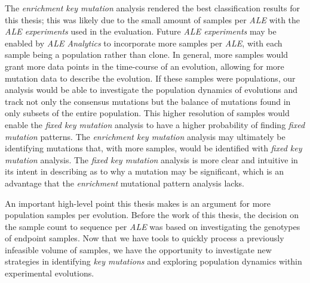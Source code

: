\documentclass[12pt,final,masters,chapterheads]{ucsd}  %
\begin{document}
The \textit{enrichment key mutation} analysis rendered the best classification results for this thesis; this was likely due to the small amount of samples per \textit{ALE} with the \textit{ALE experiments} used in the evaluation. Future \textit{ALE experiments} may be enabled by \textit{ALE Analytics} to incorporate more samples per \textit{ALE}, with each sample being a population rather than clone. In general, more samples would grant more data points in the time-course of an evolution, allowing for more mutation data to describe the evolution. If these samples were populations, our analysis would be able to investigate the population dynamics of evolutions and track not only the consensus mutations but the balance of mutations found in only subsets of the entire population. This higher resolution of samples would enable the \textit{fixed key mutation} analysis to have a higher probability of finding \textit{fixed mutation} patterns. The \textit{enrichment key mutation} analysis may ultimately be identifying mutations that, with more samples, would be identified with \textit{fixed key mutation} analysis. The \textit{fixed key mutation} analysis is more clear and intuitive in its intent in describing as to why a mutation may be significant, which is an advantage that the \textit{enrichment} mutational pattern analysis lacks.

An important high-level point this thesis makes is an argument for more population samples per evolution. Before the work of this thesis, the decision on the sample count to sequence per \textit{ALE} was based on investigating the genotypes of endpoint samples. Now that we have tools to quickly process a previously infeasible volume of samples, we have the opportunity to investigate new strategies in identifying \textit{key mutations} and exploring population dynamics within experimental evolutions.
\end{document}
